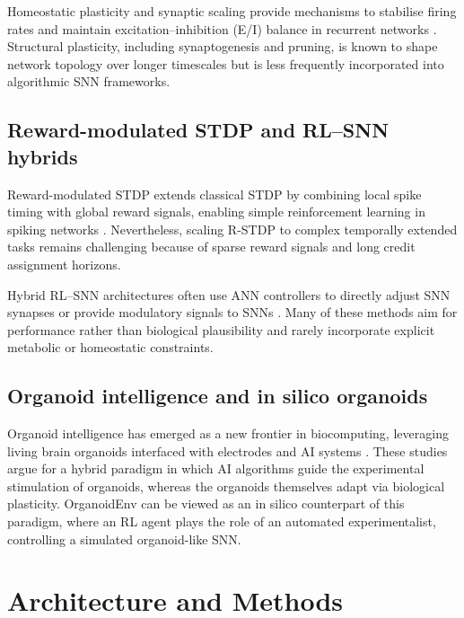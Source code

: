 \documentclass[journal]{IEEEtran}
\begin{document}
Homeostatic plasticity and synaptic scaling provide mechanisms to stabilise firing rates and maintain excitation--inhibition (E/I) balance in recurrent networks \cite{Turrigiano2008SelfTuning,HomeostaticSTDP2010,eLifeHomeostatic2025}. 
Structural plasticity, including synaptogenesis and pruning, is known to shape network topology over longer timescales but is less frequently incorporated into algorithmic SNN frameworks.

\subsection{Reward-modulated STDP and RL--SNN hybrids}

Reward-modulated STDP extends classical STDP by combining local spike timing with global reward signals, enabling simple reinforcement learning in spiking networks \cite{Florian2007rstdp,FarriesFairhall2007}. 
Nevertheless, scaling R-STDP to complex temporally extended tasks remains challenging because of sparse reward signals and long credit assignment horizons.

Hybrid RL--SNN architectures often use ANN controllers to directly adjust SNN synapses or provide modulatory signals to SNNs \cite{AcetylcholineNav2018,Bellec2018l2l,Zheng2024SNNRL}. 
Many of these methods aim for performance rather than biological plausibility and rarely incorporate explicit metabolic or homeostatic constraints.

\subsection{Organoid intelligence and in silico organoids}

Organoid intelligence has emerged as a new frontier in biocomputing, leveraging living brain organoids interfaced with electrodes and AI systems \cite{Smirnova2023OI,Hartung2023OIworkshop,Xiong2024BridgingAI}. 
These studies argue for a hybrid paradigm in which AI algorithms guide the experimental stimulation of organoids, whereas the organoids themselves adapt via biological plasticity. 
OrganoidEnv can be viewed as an in silico counterpart of this paradigm, where an RL agent plays the role of an automated experimentalist, controlling a simulated organoid-like SNN.

\section{Architecture and Methods}
\end{document}

